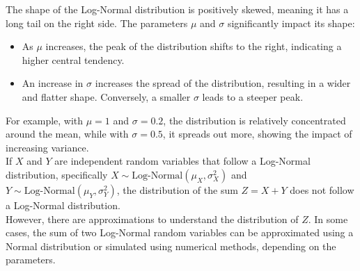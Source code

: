 The shape of the Log-Normal distribution is positively skewed, meaning it has a long tail on the right side. The parameters $\mu$ and $\sigma$ significantly impact its shape:

\begin{itemize}
    \item As $\mu$ increases, the peak of the distribution shifts to the right, indicating a higher central tendency.
    \item An increase in $\sigma$ increases the spread of the distribution, resulting in a wider and flatter shape. Conversely, a smaller $\sigma$ leads to a steeper peak.
\end{itemize}

\begin{center}
    \end{center}

    For example, with $\mu = 1$ and $\sigma = 0.2$, the distribution is relatively concentrated around the mean, while with $\sigma = 0.5$, it spreads out more, showing the impact of increasing variance.\\

    If \( X \) and \( Y \) are independent random variables that follow a Log-Normal distribution, specifically \( X \sim \text{Log-Normal}(\mu_X, \sigma_X^2) \) and \( Y \sim \text{Log-Normal}(\mu_Y, \sigma_Y^2) \), the distribution of the sum \( Z = X + Y \) does not follow a Log-Normal distribution. \\

However, there are approximations to understand the distribution of \( Z \). In some cases, the sum of two Log-Normal random variables can be approximated using a Normal distribution or simulated using numerical methods, depending on the parameters.

